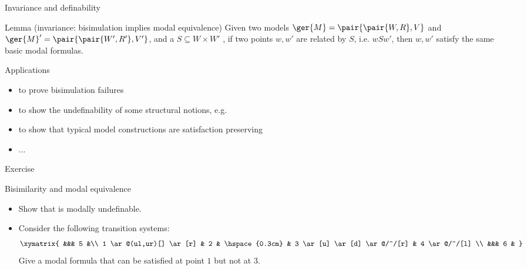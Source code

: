 \documentclass{beamer}
\begin{document}
\begin{slide}{Invariance and definability}\label{s:31}
\small
\begin{block}{Lemma (invariance: bisimulation implies modal equivalence)}
Given two models $\ger{M} = \pair{\pair{W, R}, V}$ and $\ger{M}' = \pair{\pair{W', R'}, V'}$, and a  
$S \subseteq W \times W'$ , if two points $w, w'$ are related by $S$, i.e. $w S w'$, then $w, w'$  satisfy the same basic modal formulas.
 \end{block}
\begin{block}{Applications}
\begin{itemize}
\item to prove bisimulation failures
\item to show the undefinability of some structural notions, e.g. 
\item  to show that typical model constructions are satisfaction preserving
\item ...
\end{itemize}
\end{block}
\end{slide}

\begin{slide}{\red Exercise}\label{s:32}
\small
\begin{block}{Bisimilarity and modal equivalence}
\begin{itemize}
\item Show that   is modally undefinable.
\item Consider the following transition systems:
\begin{equation*}
\xymatrix{
&&& 5 &\\
1 \ar@(ul,ur)[]  \ar[r] & 2 & \hspace{0.3cm} & 3 \ar[u] \ar[d]  \ar@/^/[r]   & 4 \ar@/^/[l]  \\
&&& 6 &
}
\end{equation*}
Give a modal formula that can be satisfied at point $1$ but not at $3$.
\end{itemize}
\end{block}
\end{slide}
\end{document}
